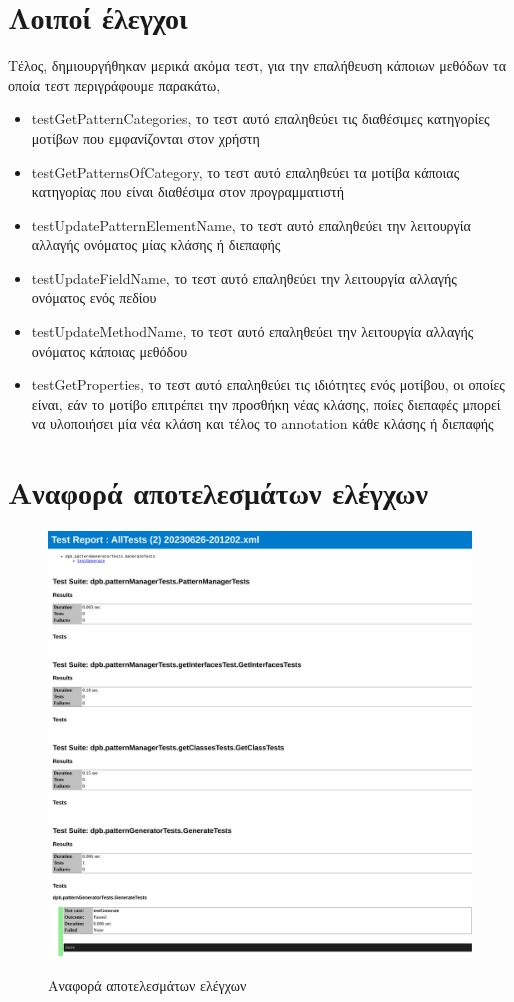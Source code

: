 \section{Λοιποί έλεγχοι}
\label{sec:moreTests}
Τέλος, δημιουργήθηκαν μερικά ακόμα τεστ, για την επαλήθευση κάποιων μεθόδων τα οποία τεστ περιγράφουμε παρακάτω,
\begin{itemize}
    \item testGetPatternCategories, το τεστ αυτό επαληθεύει τις διαθέσιμες κατηγορίες μοτίβων που εμφανίζονται στον χρήστη
    \item testGetPatternsOfCategory, το τεστ αυτό επαληθεύει τα μοτίβα κάποιας κατηγορίας που είναι διαθέσιμα στον προγραμματιστή
    \item testUpdatePatternElementName, το τεστ αυτό επαληθεύει την λειτουργία αλλαγής ονόματος μίας κλάσης ή διεπαφής
    \item testUpdateFieldName, το τεστ αυτό επαληθεύει την λειτουργία αλλαγής ονόματος ενός πεδίου
    \item testUpdateMethodName, το τεστ αυτό επαληθεύει την λειτουργία αλλαγής ονόματος κάποιας μεθόδου
    \item testGetProperties, το τεστ αυτό επαληθεύει τις ιδιότητες ενός μοτίβου, οι οποίες είναι, εάν το μοτίβο επιτρέπει την προσθήκη
    νέας κλάσης, ποίες διεπαφές μπορεί να υλοποιήσει μία νέα κλάση και τέλος το annotation κάθε κλάσης ή διεπαφής
\end{itemize}
\section{Αναφορά αποτελεσμάτων ελέγχων}
\label{sec:testReport}
\begin{figure}[H]
    \includegraphics[width=1.0\textwidth]{Figures/test_report.png}
    \label{fig:testReport}
    \caption{Αναφορά αποτελεσμάτων ελέγχων}
\end{figure}
